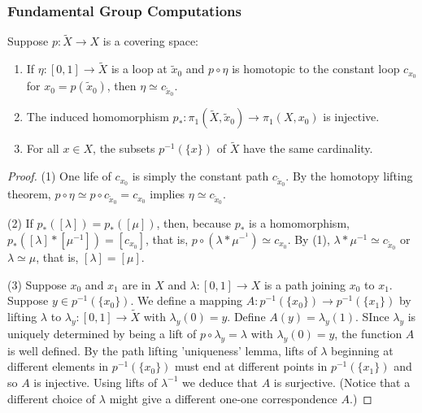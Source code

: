 \subsubsection{Fundamental Group Computations}\label{fundamentalgroupcomputations}

\begin{corollary}
Suppose $p : \tilde X \rightarrow X$ is a covering space:
\begin{enumerate}
  \item If $\eta : [0,1] \rightarrow \tilde X$ is a loop at $\tilde x_0$ and $p \circ \eta$ is homotopic to the constant loop $c_{x_0}$ for $x_0 = p(\tilde x_0)$, then $\eta \simeq c_{\tilde x_0}$.
  \item The induced homomorphism $p_{*} : \pi_1(\tilde X, \tilde x_0) \rightarrow \pi_1(X, x_0)$ is injective.
  \item For all $x \in X$, the subsets $p^{-1}(\{x\})$ of $\tilde X$ have the same cardinality.
\end{enumerate}
\end{corollary}

\begin{proof}
(1) One life of $c_{x_0}$ is simply the constant path $c_{\tilde x_0}$. By the homotopy lifting theorem,
$p \circ \eta \simeq p \circ c_{\tilde x_0} = c_{x_0}$ implies $\eta \simeq c_{\tilde x_0}.$

(2) If $p_*([\lambda]) = p_*([\mu])$, then, because $p_*$ is a homomorphism, $p_*([\lambda] * [\mu^{-1}]) = [c_{x_0}]$, that is,
$p \circ (\lambda * \mu^{-^1}) \simeq c_{x_0}$. By (1), $\lambda * \mu^{-1} \simeq c_{\tilde x_0}$ or $\lambda \simeq \mu$, that is,
$[\lambda] = [\mu]$.

(3) Suppose $x_0$ and $x_1$ are in $X$ and $\lambda : [0,1] \rightarrow X$ is a path joining $x_0$ to $x_1$. Suppose $y \in p^{-1}(\{x_0\}).$ We define
a mapping $A : p^{-1}(\{ x_0 \}) \rightarrow p^{-1}(\{ x_1 \})$ by lifting $\lambda$ to $\lambda_y : [0,1] \rightarrow \tilde X$ with $\lambda_y(0) = y$.
Define $A(y) = \lambda_y(1)$. SInce $\lambda_y$ is uniquely determined by being a lift of $p \circ \lambda_y = \lambda$ with $\lambda_y(0) = y$, the function $A$ is well defined.
By the path lifting 'uniqueness' lemma, lifts of $\lambda$ beginning at different elements in $p^{-1}(\{ x_0 \})$ must end at different points in $p^{-1}(\{ x_1 \})$ and so $A$ is injective.
Using lifts of $\lambda^{-1}$ we deduce that $A$ is surjective. (Notice that a different choice of $\lambda$ might give a different one-one correspondence $A$.)
\end{proof}


